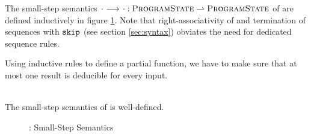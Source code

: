 The small-step semantics ${\cdot} \,\,{\longrightarrow^{}}\,\, {\cdot} : \textup{\textsc{ProgramState}} \rightharpoonup \textup{\textsc{ProgramState}}$ of \svlidf are defined inductively in figure \ref{fig:svl-sem-dyn-sstep}.
Note that right-associativity of \ttt{;} and termination of sequences with $\textup{\texttt{skip}}$ (see section \ref{sec:syntax}) obviates the need for dedicated sequence rules.

Using inductive rules to define a partial function, we have to make sure that at most one result is deducible for every input.
\begin{lemma}
    \label{lemma:ss-wd}~\\
    The small-step semantics of \svlidf is well-defined.
\end{lemma}

\begin{figure}
    \boxed{\sstep{\pi}{\pi}}
    
    \caption{\svlidf: Small-Step Semantics}
    \label{fig:svl-sem-dyn-sstep}
\end{figure}



